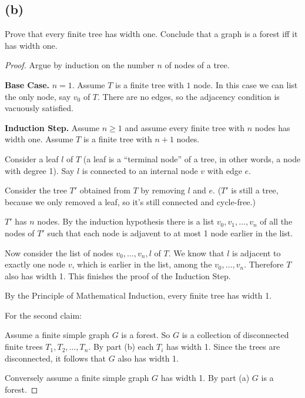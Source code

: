 \documentclass[14pt]{extarticle}
\begin{document}
\subsection{(b)}
Prove that every finite tree has width one. Conclude that a graph is a forest iff it has width one.

\begin{proof}
Argue by induction on the number $n$ of nodes of a tree.

{\bf Base Case.} $n = 1$. Assume $T$ is a finite tree with $1$ node. In this case we can list the only node, say $v_0$ of $T$. There are no edges, so the adjacency condition is vacuously satisfied.

{\bf Induction Step.} Assume $n \geq 1$ and assume every finite tree with $n$ nodes has width one. Assume $T$ is a finite tree with $n+1$ nodes.

Consider a leaf $l$ of $T$ (a leaf is a ``terminal node'' of a tree, in other words, a node with degree 1). Say $l$ is connected to an internal node $v$ with edge $e$.

Consider the tree $T'$ obtained from $T$ by removing $l$ and $e$. ($T'$ is still a tree, because we only removed a leaf, so it's still connected and cycle-free.)

$T'$ has $n$ nodes. By the induction hypothesis there is a list $v_0, v_1, \ldots, v_n$ of all the nodes of $T'$ such that each node is adjavent to at most 1 node earlier in the list.

Now consider the list of nodes $v_0, \ldots, v_n, l$ of $T$. We know that $l$ is adjacent to exactly one node $v$, which is earlier in the list, among the $v_0, \ldots, v_n$. Therefore $T$ also has width 1. This finishes the proof of the Induction Step.

By the Principle of Mathematical Induction, every finite tree has width 1.

For the second claim:

Assume a finite simple graph $G$ is a forest. So $G$ is a collection of disconnected finite trees $T_1, T_2, \ldots, T_n$. By part (b) each $T_i$ has width 1. Since the trees are disconnected, it follows that $G$ also has width 1.

Conversely assume a finite simple graph $G$ has width 1. By part (a) $G$ is a forest.
\end{proof}
\end{document}
